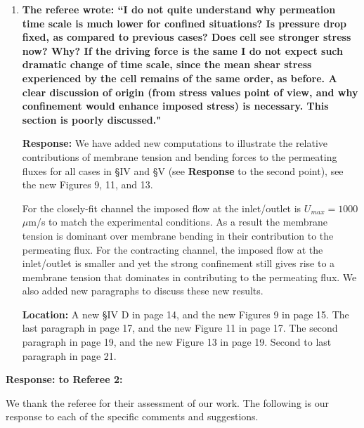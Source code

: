 \documentclass[12pt]{article}
\begin{document}
\begin{enumerate}
\item{\bf
The referee wrote:
``I do not quite understand why permeation time scale is much lower
for confined situations? Is pressure drop fixed, as compared to
previous cases? Does cell see stronger stress now? Why? If the driving
force is the same I do not expect such dramatic change of time scale,
since the mean shear stress experienced by the cell remains of the
same order, as before. A clear discussion of origin (from stress
values point of view, and why confinement would enhance imposed
stress) is necessary. This section is poorly discussed."}

\noindent
{\bf Response:}  We have added new computations to illustrate the relative contributions of membrane tension and bending forces to the permeating fluxes for all cases in \S IV and \S V (see {\bf Response} to the second point), see the new Figures 9, 11, and 13.

For the closely-fit channel the imposed flow at the inlet/outlet is
$U_{max}=1000$ $\mu$m/s to match the experimental conditions. As a
result the membrane tension is dominant over membrane bending in their
contribution to the permeating flux. For the contracting channel, the
imposed flow at the inlet/outlet is smaller and yet the strong
confinement still gives rise to a membrane tension that dominates in
contributing to the permeating flux. We also added new paragraphs to
discuss these new results.

\noindent
{\bf Location:} A new \S IV D in page 14, and the new Figures 9 in page 15. The last paragraph in page 17, and the new Figure 11 in page 17. The second paragraph in page 19, and the new Figure 13 in page 19. Second to last paragraph in page 21.

\end{enumerate}

\newpage
\vspace{0.5cm}
{\large \bf {\bf Response:} to Referee 2:}
\vspace{0.5cm}

We thank the referee for their assessment of our work.  The following is
our response to each of the specific comments and suggestions.
\end{document}
